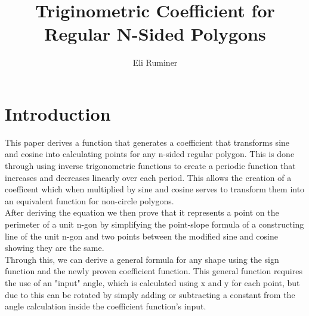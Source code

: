 \documentclass[11pt]{article}
\title{Triginometric Coefficient for Regular N-Sided Polygons}
\author{Eli Ruminer}
\date{}
\begin{document}
\begin{titlepage}
\clearpage\maketitle
\thispagestyle{empty}
\end{titlepage}

\tableofcontents
\newpage

\section{Introduction}
This paper derives a function that generates a coefficient that transforms sine and cosine into calculating points for any n-sided regular polygon. This is done through using inverse trigonometric functions to create a periodic function that increases and decreases linearly over each period. This allows the creation of a coefficent which when multiplied by sine and cosine serves to transform them into an equivalent function for non-circle polygons.\\
 After deriving the equation we then prove that it represents a point on the perimeter of a unit n-gon by simplifying the point-slope formula of a constructing line of the unit n-gon and two points between the modified sine and cosine showing they are the same. \\
Through this, we can derive a general formula for any shape using the sign function and the newly proven coefficient function. This general function requires the use of an "input" angle, which is calculated using x and y for each point, but due to this can be rotated by simply adding or subtracting a constant from the angle calculation inside the coefficient function's input.
\end{document}
